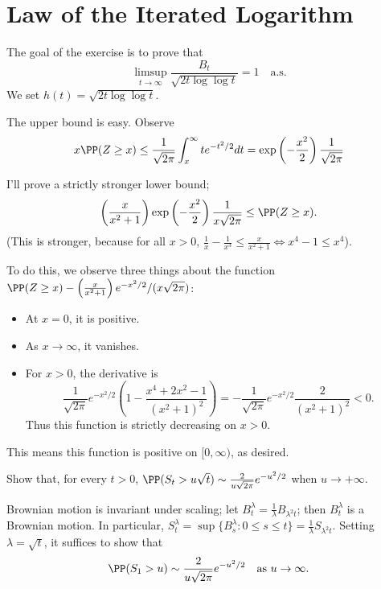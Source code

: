 \documentclass{scrartcl}
\begin{document}

\section{Law of the Iterated Logarithm}
\begin{prob*}
    The goal of the exercise is to prove that
    \[
        \limsup_{t \to \infty} \frac{B_t}{\sqrt{2t\log\log t}} = 1 \quad \text{a.s.}
    \]
    We set $h(t) = \sqrt{2t\log\log t}$.
\end{prob*}
The upper bound is easy. Observe
\[
    x\PP(Z \geq x) \leq \frac{1}{\sqrt{2\pi}} \int_x^\infty t e^{-t^2 / 2} dt = \exp\left(-\frac{x^2}{2}\right)\frac{1}{\sqrt{2\pi}}  
\]

I'll prove a strictly stronger lower bound;
\[
    \left( \frac{x}{x^2 + 1}\right) \exp\left(-\frac{x^2}{2}\right)\frac{1}{x\sqrt{2\pi}} \leq \PP(Z \geq x).    
\]
(This is stronger, because for all $x > 0$, $\frac{1}{x} - \frac{1}{x^3}\leq \frac{x}{x^2 + 1}\iff x^4 - 1  \leq x^4$).

To do this, we observe three things about the function $\PP(Z\geq x) - \left(\frac{x}{x^2 + 1}\right)e^{-x^2/2}/(x\sqrt{2\pi})$:
\begin{itemize}
    \item At $x = 0$, it is positive.
    \item As $x\to \infty$, it vanishes.
    \item For $x > 0$, the derivative is
    \[
        \frac{1}{\sqrt{2\pi}}e^{-x^2 / 2} \left( 1 - \frac{x^4 + 2x^2 - 1}{(x^2 + 1)^2}\right) = -\frac{1}{\sqrt{2\pi}} e^{-x^2 / 2} \frac{2}{(x^2 + 1)^2} < 0.
    \]
    Thus this function is strictly decreasing on $x > 0$.
\end{itemize}

This means this function is positive on $[0,\infty)$, as desired.

\begin{prob}
    Show that, for every $t > 0$, $\PP(S_t > u\sqrt{t}) \sim \frac{2}{u\sqrt{2\pi}} e^{-u^2/2}$ when $u \to +\infty$.
\end{prob}
Brownian motion is invariant under scaling; let $B^\lambda_t = \frac{1}{\lambda}B_{\lambda^2 t}$; then $B^\lambda_t$ is a Brownian motion. In particular, $S^\lambda_t = \sup\{B^\lambda_s: 0\leq s\leq t\} = \frac{1}{\lambda}S_{\lambda^2 t}$. Setting $\lambda = \sqrt{t}$, it suffices to show that
\[
    \PP(S_1 > u) \sim \frac{2}{u\sqrt{2\pi}} e^{-u^2/2} \quad \text{as } u \to \infty.
\]
\end{document}
